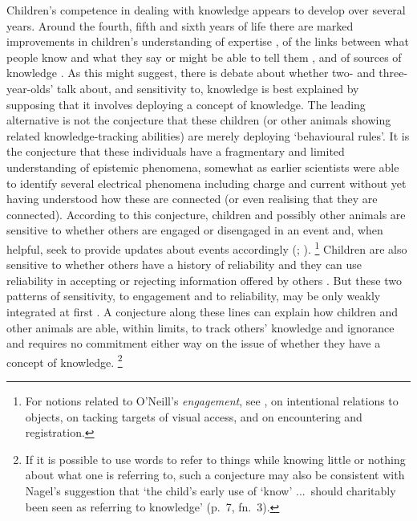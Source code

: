 \documentclass[11pt,a4paper]{extarticle}
\begin{document}
Children's competence in dealing with knowledge appears to develop over several years.
Around the fourth, fifth and sixth years of life there are marked improvements in 
children's understanding 
of expertise 
\citep{lutz_early_2002,sobel_children_2010},
of the links between what people know and what they say or might be able to tell them \citep{Robinson:1994nw,Robinson:2010uq},
and
of sources of knowledge \citep{ONeill:1992ct,ONeill:2001co,Robinson:2006vl}.
As this might suggest,
there is debate about whether two- and three-year-olds' talk about, and sensitivity to, knowledge is best explained by supposing that it involves deploying a concept of knowledge.
The leading alternative is not the conjecture that these children (or other animals showing related knowledge-tracking abilities) are merely deploying `behavioural rules'.
It is the conjecture that these individuals have a fragmentary and limited understanding of epistemic phenomena, somewhat as earlier scientists were able to identify several electrical phenomena including charge and current without yet having understood how these are connected (or even realising that they are connected).
According to this conjecture, children and possibly other animals are sensitive to whether others are engaged or disengaged in an event and, when helpful, seek to provide updates about events accordingly
(\citealp[pp.\ 88-9]{ONeill:2005ff};
\citealp{viranyi_nonverbal_2005}).%
\footnote{
For notions related to O'Neill's \emph{engagement}, see 
\citet{Doherty:2006wz}, 
\citet{Gomez:2007fk} on intentional relations to objects, 
 \citet[p.\ 58]{Call:2005qe} on tacking targets of visual access,
and \citet{butterfill_minimal} on encountering and registration.
}
Children are also sensitive to whether others have a history of reliability and they can use reliability in accepting or rejecting information offered by others \citep{Koenig:2005rc,birch_three-_2008}.
But these two patterns of sensitivity, to engagement and to reliability, may be only weakly integrated at first \citep{nurmsoo_childrens_2009,nurmsoo_identifying_2009}.
A conjecture along these lines can explain how children and other animals are able, within limits, to track others' knowledge and ignorance 
and requires no commitment either way on the issue of whether they have a concept of knowledge.%
\footnote{
If it is possible to use words to refer to things while  knowing little or nothing about what one is referring to,
such a conjecture may also be consistent with Nagel's suggestion that `the child's early use of `know' ...\ should charitably been seen as referring to knowledge' (p.\ 7, fn.\ 3).
}
\end{document}
